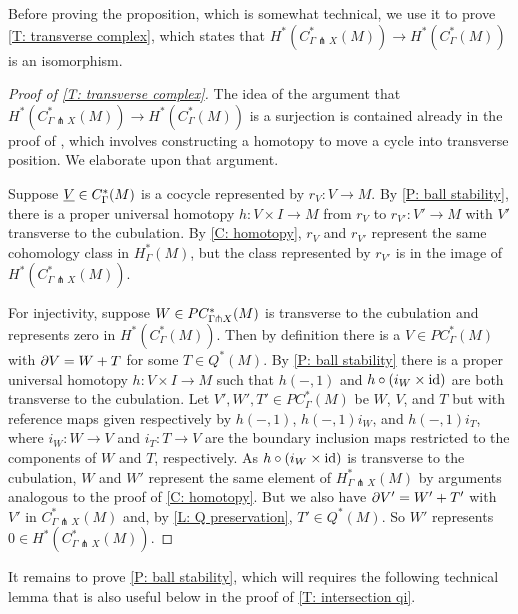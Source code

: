 Before proving the proposition, which is somewhat technical, we use it to prove \cref{T: transverse complex}, which states that $H^*(C^*_{\Gamma \pitchfork X}(M)) \to H^*(C_\Gamma^*(M))$ is an isomorphism.



\begin{proof}[Proof of \cref{T: transverse complex}]
	The idea of the argument that $H^*(C^*_{\Gamma \pitchfork X}(M)) \to H^*(C_\Gamma^*(M))$ is a surjection is contained already in the proof of \cite[Lemma 15]{Lipy14}, which involves constructing a homotopy to move a cycle into transverse position.
	We elaborate upon that argument.

Suppose $\underline{V} \in C_\Gamma^*(M)$ is a cocycle represented by $r_V \colon V \to M$. By \cref{P: ball stability}, there is a proper universal homotopy $h: V \times I \to M$ from $r_V$ to $r_{V'} \colon V' \to M$ with $V'$ transverse to the cubulation.
By \cref{C: homotopy}, $r_V$ and $r_{V'}$ represent the same cohomology class in $H^*_{\Gamma}(M)$, but the class represented by $r_{V'}$ is in the image of $H^*(C^*_{\Gamma \pitchfork X}(M))$.


For injectivity, suppose $W \in PC^*_{\Gamma\pitchfork X}(M)$ is transverse to the cubulation and represents zero in $H^*(C_\Gamma^*(M))$. Then by definition there is a $V \in PC^*_\Gamma(M)$ with $\partial V = W+T$ for some
	$T \in Q^*(M)$.
By \cref{P: ball stability} there is a proper universal homotopy $h \colon V \times I \to M$ such that $h(-,1)$ and $h\circ(i_{W} \times \mathrm{id})$ are both transverse to the cubulation.
Let $V', W',T' \in PC^*_\Gamma(M)$ be $W$, $V$, and $T$ but with reference maps given respectively by $h(-,1)$, $h(-,1)i_W$, and $h(-,1)i_T$, where $i_W \colon W \to V$ and $i_T:T \to V$ are the boundary inclusion maps restricted to the components of $W$ and $T$, respectively.
As $h\circ(i_{W} \times \mathrm{id})$ is transverse to the cubulation, $W$ and $W'$ represent the same element of $H^*_{\Gamma \pitchfork X}(M)$ by arguments analogous to the proof of \cref{C: homotopy}.
But we also have $\partial V' = W'+T'$ with $V'$ in $C^*_{\Gamma \pitchfork X}(M)$ and, by \cref{L: Q preservation}, $T' \in Q^*(M)$. So $W'$ represents $0 \in H^*(C^*_{\Gamma \pitchfork X}(M))$.
\end{proof}

It remains to prove \cref{P: ball stability}, which will requires the following technical lemma that is also useful below in the proof of \cref{T: intersection qi}.

